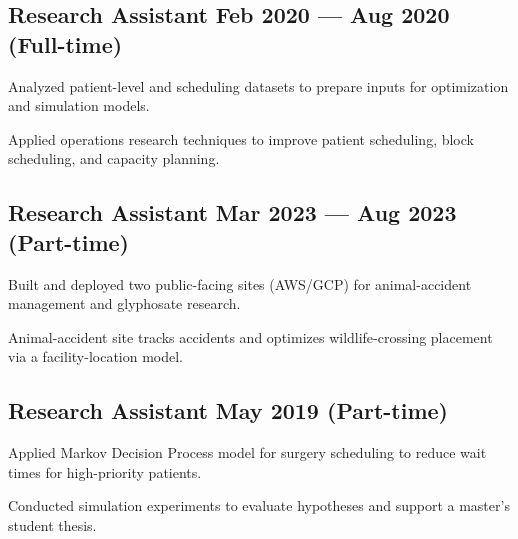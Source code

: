 \subsection{{Research Assistant \hfill Feb 2020 --- Aug 2020 (Full-time)}}
\begin{zitemize}
    \setlength\itemsep{0.4em}
    \item Analyzed patient-level and scheduling datasets to prepare inputs for optimization and simulation models.
    \item Applied operations research techniques to improve patient scheduling, block scheduling, and capacity planning.
\end{zitemize}
\vspace{0.75em}

\subsection{{Research Assistant \hfill Mar 2023 --- Aug 2023 (Part-time)}}
\begin{zitemize}
    \setlength\itemsep{0.4em}
    \item Built and deployed two public-facing sites (AWS/GCP) for animal-accident management and glyphosate research.
    \item Animal-accident site tracks accidents and optimizes wildlife-crossing placement via a facility-location model.
\end{zitemize}
\vspace{0.75em}

\subsection{{Research Assistant \hfill May 2019 (Part-time)}}
\begin{zitemize}
    \setlength\itemsep{0.4em}
    \item Applied Markov Decision Process model for surgery scheduling to reduce wait times for high-priority patients.
    \item Conducted simulation experiments to evaluate hypotheses and support a master's student thesis.
\end{zitemize}

